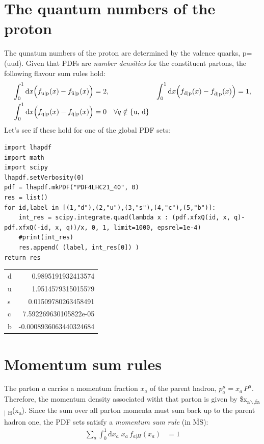 \documentclass[11pt]{article}
\begin{document}
\section{The quantum numbers of the proton}
\label{sec:orgcb00eb9}
The qunatum numbers of the proton are determined by the valence quarks, p=(uud).
Given that PDFs are \emph{number densities} for the constituent partons, the following flavour sum rules hold:
\begin{align}
  \int_0^1\mathrm{d}x \Bigl(
    f_{\mathrm{u}\vert\mathrm{p}}(x)
  - f_{\bar{\mathrm{u}}\vert\mathrm{p}}(x)
  \Bigr)
  &= 2, &
  \int_0^1\mathrm{d}x \Bigl(
    f_{\mathrm{d}\vert\mathrm{p}}(x)
  - f_{\bar{\mathrm{d}}\vert\mathrm{p}}(x)
  \Bigr)
  &= 1,
  \\
  \int_0^1\mathrm{d}x \Bigl(
    f_{\mathrm{q}\vert\mathrm{p}}(x)
  - f_{\bar{\mathrm{q}}\vert\mathrm{p}}(x)
  \Bigr)
  &= 0 \quad \forall q \notin \{\mathrm{u},\,\mathrm{d}\}
\end{align}
Let's see if these hold for one of the global PDF sets:
\begin{verbatim}
import lhapdf
import math
import scipy
lhapdf.setVerbosity(0)
pdf = lhapdf.mkPDF("PDF4LHC21_40", 0)
res = list()
for id,label in [(1,"d"),(2,"u"),(3,"s"),(4,"c"),(5,"b")]:
    int_res = scipy.integrate.quad(lambda x : (pdf.xfxQ(id, x, q)-pdf.xfxQ(-id, x, q))/x, 0, 1, limit=1000, epsrel=1e-4)
    #print(int_res)
    res.append( (label, int_res[0]) )
return res
\end{verbatim}

\begin{center}
\begin{tabular}{lr}
d & 0.9895191932413574\\[0pt]
u & 1.9514579315015579\\[0pt]
s & 0.01509780263458491\\[0pt]
c & 7.592269630105822e-05\\[0pt]
b & -0.0008936063440324684\\[0pt]
\end{tabular}
\end{center}

\section{Momentum sum rules}
\label{sec:org1ed66b7}
The parton \(a\) carries a momentum fraction \(x_a\) of the parent hadron, \(p_a^\mu=x_a\,P^\mu\).
Therefore, the momentum density associated witht that parton is given by \$x\textsubscript{a$\backslash$,f}\textsubscript{a\(\vert{}\) H}(x\textsubscript{a}).
Since the sum over all parton momenta must sum back up to the parent hadron one, the PDF sets satisfy a \emph{momentum sum rule} (in \(\overline{\text{MS}}\)):
\begin{align}
  \sum_a \int_0^1 \mathrm{d}x_a \; x_a\,f_{a\vert H}(x_a)
  &= 1
\end{align}
\end{document}
